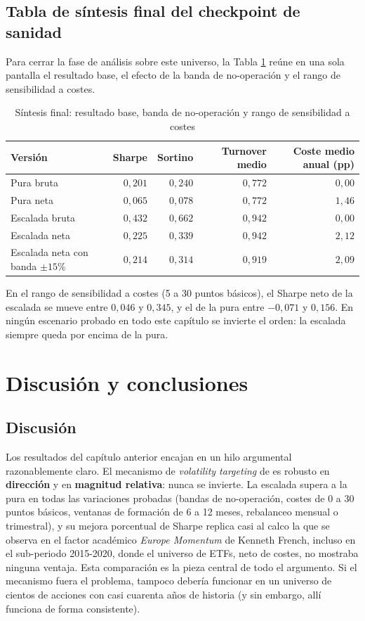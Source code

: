 \documentclass[12pt]{report} %
\begin{document}
\section{Tabla de síntesis final del checkpoint de sanidad}

Para cerrar la fase de análisis sobre este universo, la Tabla \ref{tab:cierre} reúne en una sola pantalla el resultado base, el efecto de la banda de no-operación y el rango de sensibilidad a costes.

\begin{table}[H]
\centering
\caption{Síntesis final: resultado base, banda de no-operación y rango de sensibilidad a costes}
\label{tab:cierre}
\begin{tabular}{|l|r|r|r|r|}
\hline
\textbf{Versión} & \textbf{Sharpe} & \textbf{Sortino} & \textbf{Turnover medio} & \textbf{Coste medio anual (pp)} \\
\hline
Pura bruta & $0{,}201$ & $0{,}240$ & $0{,}772$ & $0{,}00$ \\
Pura neta & $0{,}065$ & $0{,}078$ & $0{,}772$ & $1{,}46$ \\
Escalada bruta & $0{,}432$ & $0{,}662$ & $0{,}942$ & $0{,}00$ \\
Escalada neta & $0{,}225$ & $0{,}339$ & $0{,}942$ & $2{,}12$ \\
Escalada neta con banda $\pm15\%$ & $0{,}214$ & $0{,}314$ & $0{,}919$ & $2{,}09$ \\
\hline
\end{tabular}
\end{table}

En el rango de sensibilidad a costes (5 a 30 puntos básicos), el Sharpe neto de la escalada se mueve entre $0{,}046$ y $0{,}345$, y el de la pura entre $-0{,}071$ y $0{,}156$. En ningún escenario probado en todo este capítulo se invierte el orden: la escalada siempre queda por encima de la pura.


\chapter{Discusión y conclusiones}

\section{Discusión}

Los resultados del capítulo anterior encajan en un hilo argumental razonablemente claro. El mecanismo de \textit{volatility targeting} de \citet{barroso2015} es robusto en \textbf{dirección} y en \textbf{magnitud relativa}: nunca se invierte. La escalada supera a la pura en todas las variaciones probadas (bandas de no-operación, costes de 0 a 30 puntos básicos, ventanas de formación de 6 a 12 meses, rebalanceo mensual o trimestral), y su mejora porcentual de Sharpe replica casi al calco la que se observa en el factor académico \textit{Europe Momentum} de Kenneth French, incluso en el sub-periodo 2015-2020, donde el universo de ETFs, neto de costes, no mostraba ninguna ventaja. Esta comparación es la pieza central de todo el argumento. Si el mecanismo fuera el problema, tampoco debería funcionar en un universo de cientos de acciones con casi cuarenta años de historia (y sin embargo, allí funciona de forma consistente).
\end{document}
